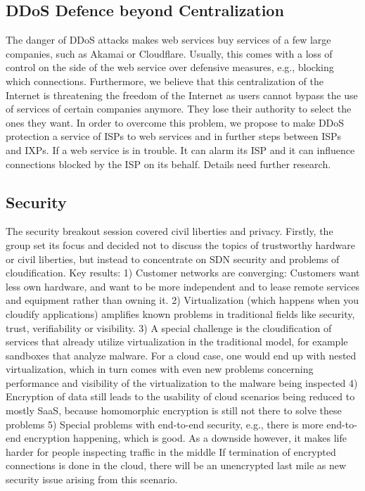 \subsection{DDoS Defence beyond Centralization}

The danger of \ac{DDoS} attacks makes web services buy services of a few large
companies, such as Akamai or Cloudflare. Usually, this comes with a loss of
control on the side of the web service over defensive measures, e.g., blocking
which connections. Furthermore, we believe that this centralization of the
Internet is threatening the freedom of the Internet as users cannot bypass the
use of services of certain companies anymore. They lose their authority to
select the ones they want. In order to overcome this problem, we propose to
make \ac{DDoS} protection a service of ISPs to web services and in further
steps between ISPs and IXPs. If a web service is in trouble. It can alarm its
ISP and it can influence connections blocked by the ISP on its behalf. Details
need further research.

\subsection{Security}

The security breakout session covered civil liberties and privacy. Firstly,
the group set its focus and decided not to discuss the topics of trustworthy
hardware or civil liberties, but instead to concentrate on \ac{SDN} security
and problems of cloudification. Key results: 1) Customer networks are
converging:  Customers want less own hardware, and want to be more independent
and to lease remote services and equipment rather than owning it.  2)
Virtualization (which happens when you cloudify applications) amplifies known
problems in traditional fields like security, trust, verifiability or
visibility.  3) A special challenge is the cloudification of services that
already utilize virtualization in the traditional model, for example sandboxes
that analyze malware.  For a cloud case, one would end up with nested
virtualization, which in turn comes with even new problems concerning
performance and visibility of the virtualization to the malware being
inspected 4) Encryption of data still leads to the usability of cloud
scenarios being reduced to mostly SaaS, because homomorphic encryption is
still not there to solve these problems 5) Special problems with end-to-end
security, e.g., there is more end-to-end encryption happening, which is good.
As a downside however, it makes life harder for people inspecting traffic in
the middle If termination of encrypted connections is done in the cloud, there
will be an unencrypted last mile as new security issue arising from this
scenario.

